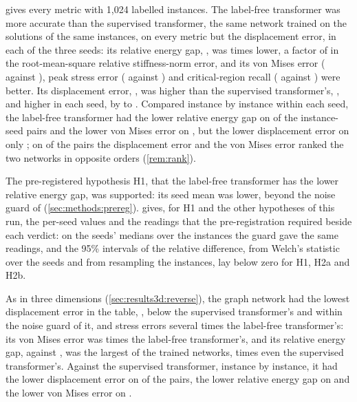  gives every metric with 1,024 labelled instances. The label-free transformer
was more accurate than the supervised transformer, the same network trained on the solutions
of the same instances, on every metric but the displacement error, in each of the three
seeds: its relative energy gap, \numCmFreeGap{}, was \numCmLabOverFreeGap{} times lower, a
factor of \numCmLabOverFreeGapRoot{} in the root-mean-square relative stiffness-norm error,
and its von Mises error (\numCmFreeVm{} against \numCmLabVm{}), peak stress error
(\numCmFreePeak{} against \numCmLabPeak{}) and critical-region recall (\numCmFreeRecall{}
against \numCmLabRecall{}) were better. Its displacement error, \numCmFreeDispFour{}, was
\numCmFreeDispExcessAbs{} higher than the supervised transformer's, \numCmLabDispFour{}, and
higher in each seed, by \numCmFreeDispExcessMin{} to \numCmFreeDispExcessMax{}. Compared
instance by instance within each seed, the label-free transformer had the lower relative
energy gap on \numPairCmLabGap{} of the \numCmPairs{} instance-seed pairs and the lower von
Mises error on \numPairCmLabVm{}, but the lower displacement error on only
\numPairCmLabDisp{}; on \numPairCmOpposite{} of the pairs the displacement error and the von
Mises error ranked the two networks in opposite orders (\cref{rem:rank}).

The pre-registered hypothesis H1, that the label-free transformer has the lower relative
energy gap, was supported: its seed mean was \numHOneRel{} lower, beyond the noise guard of
\numHOneTau{} (\cref{sec:methods:prereg}).  gives, for H1 and the other
hypotheses of this run, the per-seed values and the readings that the pre-registration
required beside each verdict: on the seeds' medians over the instances the guard gave the
same readings, and the 95\% intervals of the relative difference, from Welch's statistic
over the seeds and from resampling the instances, lay below zero for H1, H2a and H2b.

As in three dimensions (\cref{sec:results3d:reverse}), the graph network had the lowest
displacement error in the table, \numCmMgnDisp{}, \numCmMgnBelowLabDisp{} below the
supervised transformer's and within the noise guard of it, and stress errors several times
the label-free transformer's: its von Mises error was \numCmMgnOverFreeVm{} times the
label-free transformer's, and its relative energy gap, \numCmMgnGap{} against
\numCmFreeGap{}, was the largest of the trained networks, \numCmMgnOverLabGap{} times even
the
supervised transformer's. Against the supervised transformer, instance by instance, it had
the lower displacement error on \numPairCmMgnLabDisp{} of the pairs, the lower relative
energy gap on \numPairCmMgnLabGap{} and the lower von Mises error on \numPairCmMgnLabVm{}.

